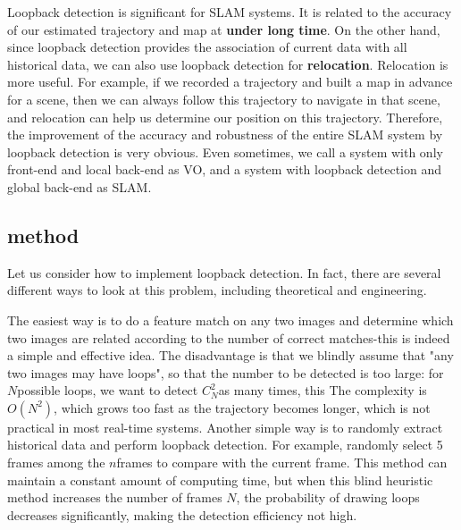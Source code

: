 Loopback detection is significant for SLAM systems. It is related to the accuracy of our estimated trajectory and map at \textbf{under long time}. On the other hand, since loopback detection provides the association of current data with all historical data, we can also use loopback detection for \textbf{relocation}. Relocation is more useful. For example, if we recorded a trajectory and built a map in advance for a scene, then we can always follow this trajectory to navigate in that scene, and relocation can help us determine our position on this trajectory. Therefore, the improvement of the accuracy and robustness of the entire SLAM system by loopback detection is very obvious. Even sometimes, we call a system with only front-end and local back-end as VO, and a system with loopback detection and global back-end as SLAM.

\subsection{method}
Let us consider how to implement loopback detection. In fact, there are several different ways to look at this problem, including theoretical and engineering.

The easiest way is to do a feature match on any two images and determine which two images are related according to the number of correct matches-this is indeed a simple and effective idea. The disadvantage is that we blindly assume that "any two images may have loops", so that the number to be detected is too large: for $N $possible loops, we want to detect $C_N ^ 2 $as many times, this The complexity is $O (N ^ 2) $, which grows too fast as the trajectory becomes longer, which is not practical in most real-time systems. Another simple way is to randomly extract historical data and perform loopback detection. For example, randomly select 5 frames among the $n $frames to compare with the current frame. This method can maintain a constant amount of computing time, but when this blind heuristic method increases the number of frames $N $, the probability of drawing loops decreases significantly, making the detection efficiency not high.

